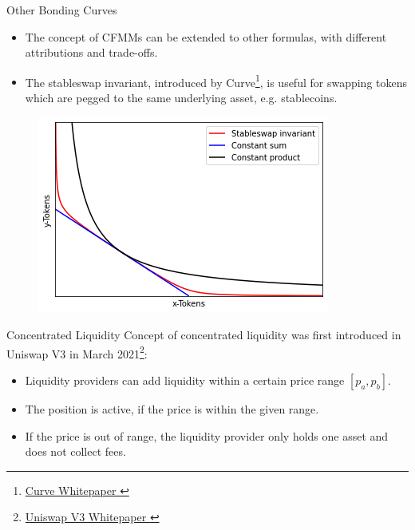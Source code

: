 \documentclass[]{beamer}
\begin{document}
\begin{frame}{Other Bonding Curves}

\begin{small}
\begin{itemize}
	\item The concept of CFMMs can be extended to other formulas, with different attributions and trade-offs. 
	\item The stableswap invariant, introduced by Curve\footnote{\href{https://curve.fi/files/stableswap-paper.pdf}{Curve Whitepaper \link}}, is useful for swapping tokens which are pegged to the same underlying asset, e.g. stablecoins.
	\end{itemize}
\end{small}

	\begin{figure}
		\includegraphics[scale=0.6]{../assets/images/bonding-curves.png}
	\end{figure}
	
\end{frame}


\begin{frame}{Concentrated Liquidity}
	Concept of concentrated liquidity was first introduced in Uniswap V3 in March 2021\footnote{\href{https://uniswap.org/whitepaper-v3.pdf}{Uniswap V3 Whitepaper \link}}:
	\begin{itemize}
		\item<2-> Liquidity providers can add liquidity within a certain price range $[p_a, p_b]$.
		\item<3-> The position is active, if the price is within the given range.
		\item<4-> If the price is out of range, the liquidity provider only holds one asset and does not collect fees.
	\end{itemize}
	\vspace{0.5cm}
\end{frame}
\end{document}
